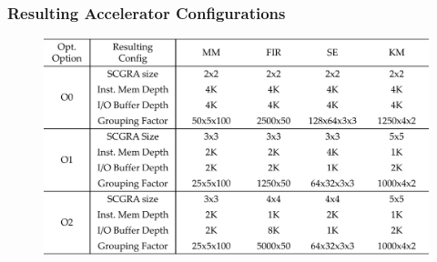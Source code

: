 \documentclass[accentcolor=tud1a,colorbacktitle,inverttitle,landscape,german,presentation,t]{tudbeamer}
\begin{document}
  \begin{frame}
  \frametitle{Resulting Accelerator Configurations}
  \begin{figure}
    \includegraphics[width=0.9\linewidth]{accel-config}
  \end{figure}
  \end{frame}
\end{document}
